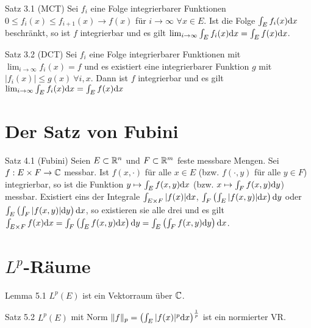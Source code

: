 \begin{namedtheorem}{Satz 3.1 (MCT)}
  Sei $f_i$ eine Folge integrierbarer Funktionen $0\leq f_i(x)\leq f_{i+1}(x) \rightarrow f(x)$ für $i\rightarrow\infty$ $\forall x\in E$. Ist die Folge $\int_E f_i(x) \mathrm{d} x$ beschränkt, so ist $f$ integrierbar und es gilt $\lim_{i\rightarrow\infty}\int_E f_i(x)\mathrm{d} x = \int_E f(x) \mathrm{d} x$.
\end{namedtheorem}

\begin{namedtheorem}{Satz 3.2 (DCT)}
  Sei $f_i$ eine Folge integrierbarer Funktionen mit $\lim_{i\rightarrow\infty} f_i(x) = f$ und es existiert eine integrierbarer Funktion $g$ mit $|f_i(x)|\leq g(x)\ \forall i,x$. Dann ist $f$ integrierbar und es gilt $\lim_{i\rightarrow\infty}\int_E f_i(x)\mathrm{d} x = \int_E f(x) \mathrm{d} x$
\end{namedtheorem}

\section{Der Satz von Fubini}

\begin{namedtheorem}{Satz 4.1 (Fubini)}
  Seien $E \subset \mathbb{R}^n$ und $F \subset \mathbb{R}^m$ feste messbare Mengen. Sei $f:E\times F \rightarrow\mathbb{C}$ messbar. Ist $f(x,\cdot)$ für alle $x\in E$ (bzw. $f(\cdot,y)$ für alle $y\in F$) integrierbar, so ist die Funktion $y\mapsto\int_Ef(x,y)\mathrm{d}x$ (bzw. $x\mapsto\int_Ff(x,y)\mathrm{d} y$) messbar. Existiert eins der Integrale $\int_{E\times F}|f(x)|\mathrm{d}x$, $\int_F\left(\int_E|f(x,y)|\mathrm{d}x\right)\mathrm{d} y$ oder $\int_E\left(\int_F|f(x,y)|\mathrm{d} y\right)\mathrm{d} x$, so existieren sie alle drei und es gilt $\int_{E\times F}f(x)\mathrm{d}x=\int_F\left(\int_E f(x,y)\mathrm{d}x\right)\mathrm{d} y=\int_E\left(\int_F f(x,y) \mathrm{d} y\right)\mathrm{d} x$.
\end{namedtheorem}

\section{$L^p$-Räume}

\begin{namedtheorem}{Lemma 5.1}
  $L^p(E)$ ist ein Vektorraum über $\mathbb{C}$.
\end{namedtheorem}

\begin{namedtheorem}{Satz 5.2}
  $L^p(E)$ mit Norm $\lVert f\rVert_p=\left(\int_E|f(x)|^p\mathrm{d} x\right)^{\frac1p}$ ist ein normierter VR.
\end{namedtheorem}


